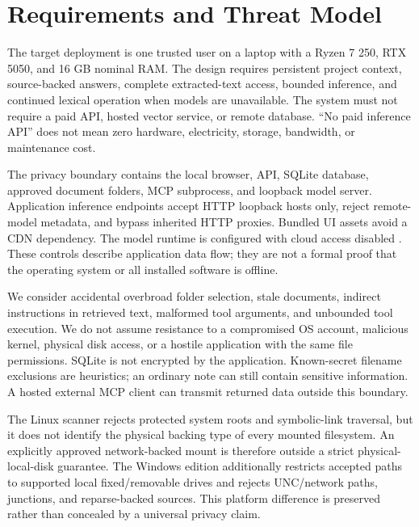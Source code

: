 \documentclass[conference,letterpaper]{IEEEtran}
\begin{document}
\section{Requirements and Threat Model}
The target deployment is one trusted user on a laptop with a Ryzen 7 250, RTX 5050, and 16 GB nominal RAM. The design requires persistent project context, source-backed answers, complete extracted-text access, bounded inference, and continued lexical operation when models are unavailable. The system must not require a paid API, hosted vector service, or remote database. ``No paid inference API'' does not mean zero hardware, electricity, storage, bandwidth, or maintenance cost.

The privacy boundary contains the local browser, API, SQLite database, approved document folders, MCP subprocess, and loopback model server. Application inference endpoints accept HTTP loopback hosts only, reject remote-model metadata, and bypass inherited HTTP proxies. Bundled UI assets avoid a CDN dependency. The model runtime is configured with cloud access disabled \cite{ollama}. These controls describe application data flow; they are not a formal proof that the operating system or all installed software is offline.

We consider accidental overbroad folder selection, stale documents, indirect instructions in retrieved text, malformed tool arguments, and unbounded tool execution. We do not assume resistance to a compromised OS account, malicious kernel, physical disk access, or a hostile application with the same file permissions. SQLite is not encrypted by the application. Known-secret filename exclusions are heuristics; an ordinary note can still contain sensitive information. A hosted external MCP client can transmit returned data outside this boundary.

The Linux scanner rejects protected system roots and symbolic-link traversal, but it does not identify the physical backing type of every mounted filesystem. An explicitly approved network-backed mount is therefore outside a strict physical-local-disk guarantee. The Windows edition additionally restricts accepted paths to supported local fixed/removable drives and rejects UNC/network paths, junctions, and reparse-backed sources. This platform difference is preserved rather than concealed by a universal privacy claim.
\end{document}
